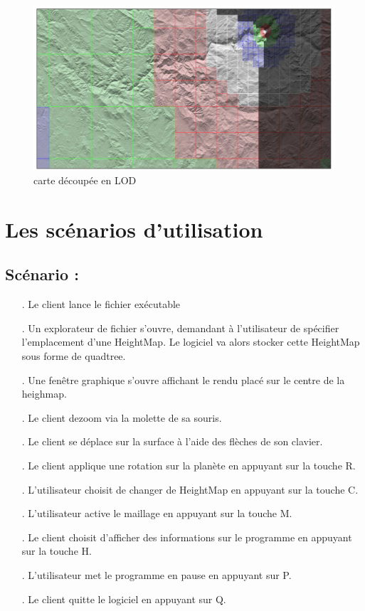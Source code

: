 \documentclass[12pt]{report}
\begin{document}
\begin{figure}[h]
    \begin{center}
    \includegraphics[scale = 0.6]{images/CDLOD2.PNG}
    \caption{carte découpée en LOD}
    \end{center}
\end{figure}


\newpage

\chapter{Les scénarios d'utilisation}
\section{Scénario :}

\begin{enumerate}

\item[\sffamily 1.] Le client lance le fichier exécutable 
\item[\sffamily 2.] Un explorateur de fichier s'ouvre, demandant à l'utilisateur de spécifier l'emplacement d'une HeightMap. Le logiciel va alors stocker cette HeightMap sous forme de quadtree.
\item[\sffamily 3.] Une fenêtre graphique s'ouvre affichant le rendu placé sur le centre de la heighmap.
\item[\sffamily 4.] Le client dezoom via la molette de sa souris.
\item[\sffamily 5.] Le client se déplace sur la surface à l'aide des flèches de son clavier. 
\item[\sffamily 6.] Le client applique une rotation sur la planète en appuyant sur la touche R.
\item[\sffamily 7.] L'utilisateur choisit de changer de HeightMap en appuyant sur la touche C.
\item[\sffamily 8.] L'utilisateur active le maillage en appuyant sur la touche M.
\item[\sffamily 9.] Le client choisit d'afficher des informations sur le programme en appuyant sur la touche H.
\item[\sffamily 10.] L'utilisateur met le programme en pause en appuyant sur P.
\item[\sffamily 11.] Le client quitte le logiciel en appuyant sur Q.



\end{enumerate}
\end{document}
